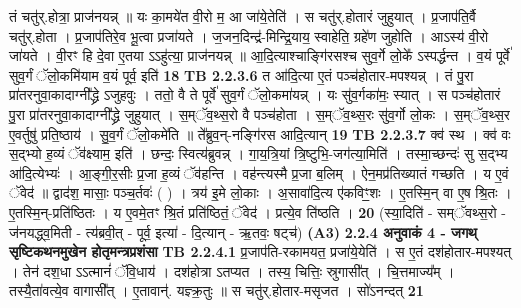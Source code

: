 \documentclass[17pt]{extarticle}
\begin{document}
                  तं चतु॑र्.होत्रा॒ प्राज॑नयन्न् ॥ यः का॒मये॑त वी॒रो म॒ आ जा॑ये॒तेति॑ । स चतु॑र्.होतारं जुहुयात् । प्र॒जाप॑ति॒र्वै चतु॑र्.होता । प्र॒जाप॑तिरे॒व भू॒त्वा प्रजा॑यते । ज॒जन॒दिन्द्र॑-मिन्द्रि॒याय॒ स्वाहेति॒ ग्रहे॑ण जुहोति । आऽस्य॑ वी॒रो जा॑यते । वी॒रꣳ हि दे॒वा ए॒तया ऽऽहु॑त्या॒ प्राज॑नयन्न् ॥ आ॒दि॒त्याश्चाङ्गि॑रसश्च सुव॒र्गे लो॒के᳚ ऽस्पर्द्धन्त । व॒यं पूर्वे॑ सुव॒र्गं ॅलो॒कमि॑याम व॒यं पूर्व॒ इति॑ \textbf{ 18} \newline
                  \newline
                                \textbf{ TB 2.2.3.6} \newline
                  त आ॑दि॒त्या ए॒तं पञ्च॑होतार-मपश्यन्न् । तं पु॒रा प्रा॑तरनुवा॒कादाग्नी᳚द्ध्रे ऽजुहवुः । ततो॒ वै ते पूर्वे॑ सुव॒र्गं ॅलो॒कमा॑यन्न् । यः सु॑व॒र्गका॑मः॒ स्यात् । स पञ्च॑होतारं पु॒रा प्रा॑तरनुवा॒कादाग्नी᳚द्ध्रे जुहुयात् । स॒म्ॅव॒थ्स॒रो वै पञ्च॑होता । स॒म्ॅव॒थ्स॒रः सु॑व॒र्गो लो॒कः । स॒म्ॅव॒थ्स॒र ए॒वर्तुषु॑ प्रति॒ष्ठाय॑ । सु॒व॒र्गं ॅलो॒कमे॑ति ॥ ते᳚ब्रुव॒न्-नङ्गि॑रस आदि॒त्यान् \textbf{ 19} \newline
                  \newline
                                \textbf{ TB 2.2.3.7} \newline
                  क्व॑ स्थ । क्व॑ वः स॒द्भ्यो ह॒व्यं ॅव॑क्ष्याम॒ इति॑ । छन्दः॒ स्वित्य॑ब्रुवन्न् । गा॒य॒त्रि॒यां त्रि॒ष्टुभि॒-जग॑त्या॒मिति॑ । तस्मा॒च्छन्दः॑ सु स॒द्भ्य आ॑दि॒त्येभ्यः॑ । आ॒ङ्गी॒र॒सीः प्र॒जा ह॒व्यं ॅव॑हन्ति । वह॑न्त्यस्मै प्र॒जा ब॒लिम् । ऐन॒मप्र॑तिख्यातं गच्छति । य ए॒वं ॅवेद॑ ॥ द्वाद॑श॒ मासाः॒ पञ्च॒र्तवः॑ ( ) । त्रय॑ इ॒मे लो॒काः । अ॒सावा॑दि॒त्य ए॑कविꣳ॒॒शः । ए॒तस्मि॒न् वा ए॒ष श्रि॒तः । ए॒तस्मि॒न्-प्रति॑ष्ठितः । य ए॒वमे॒तꣳ श्रि॒तं प्रति॑ष्ठितं॒ ॅवेद॑ । प्रत्ये॒व ति॑ष्ठति । \textbf{ 20} \newline
                  \newline
                                    (स्या॒दिति॑ - सम्ॅवथ्स॒रो - ज॑नयद्ध्व॒मिती - त्य॑ब्रवी॒त् - पूर्व॒ इत्या॑ - दि॒त्यान् - ऋ॒तवः॒ षट्च॑) \textbf{(A3)} \newline \newline
                \textbf{ 2.2.4     अनुवाकं   4 - जगथ् सृष्टिकथनमुखेन होतृमन्त्रप्रशंसा} \newline
                                \textbf{ TB 2.2.4.1} \newline
                  प्र॒जाप॑ति-रकामयत॒ प्रजा॑ये॒येति॑ । स ए॒तं दश॑होतार-मपश्यत् । तेन॑ दश॒धा ऽऽत्मानं॑ ॅवि॒धाय॑ । दश॑होत्रा ऽतप्यत । तस्य॒ चित्तिः॒ स्रुगासी᳚त् । चि॒त्तमाज्य᳚म् । तस्यै॒ता॑वत्ये॒व वागासी᳚त् । ए॒तावान्॑. यज्ञ्क्र॒तुः ॥ स चतु॑र्.होतार-मसृजत । सो॑ऽनन्दत् \textbf{ 21} \newline
\end{document}

